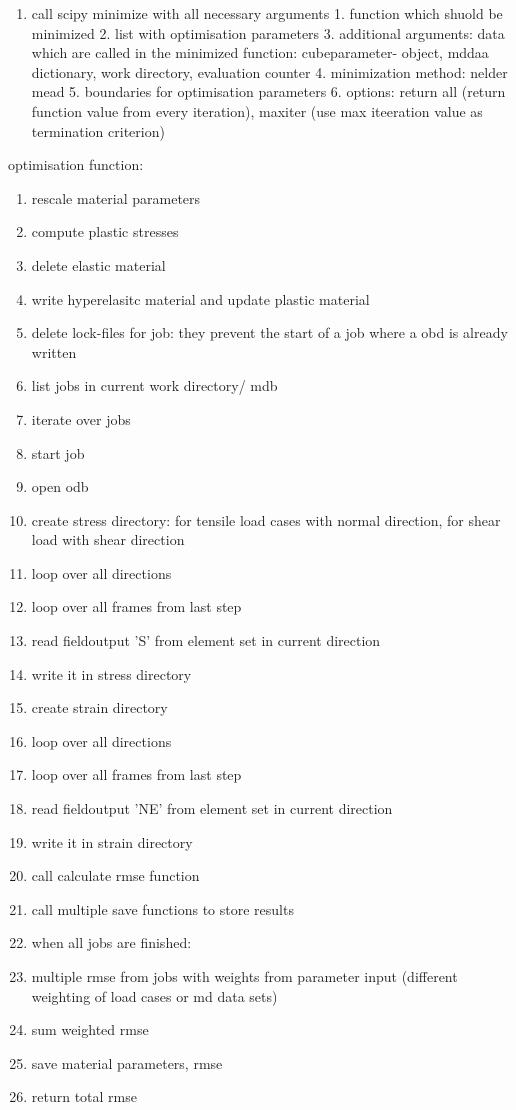     \begin{enumerate}
        \item call scipy minimize with all necessary arguments
            1. function which shuold be minimized
            2. list with optimisation parameters
            3. additional arguments: data which are called in the minimized function:
                cubeparameter- object, mddaa dictionary, work directory, evaluation counter
            4. minimization method: nelder mead
            5. boundaries for optimisation parameters
            6. options: return all (return function value from every iteration), maxiter (use max iteeration value as termination criterion)
    \end{enumerate}

    optimisation function:
    \begin{enumerate}
        \item rescale material parameters
        \item compute plastic stresses
        \item delete elastic material
        \item write hyperelasitc material and update plastic material
        \item delete lock-files for job: they prevent the start of a job where a obd is already written
        \item list jobs in current work directory/ mdb
        \item iterate over jobs
        \item start job
        \item open odb
        \item create stress directory: for tensile load cases with normal direction, for shear load with shear direction
        \item loop over all directions
        \item loop over all frames from last step
        \item read fieldoutput 'S' from element set in current direction 
        \item write it in stress directory
        \item create strain directory
        \item loop over all directions
        \item loop over all frames from last step
        \item read fieldoutput 'NE' from element set in current direction 
        \item write it in strain directory
        \item call calculate rmse function
        \item call multiple save functions to store results
        \item when all jobs are finished: 
        \item multiple rmse from jobs with weights from parameter input (different weighting of load cases or md data sets)
        \item sum weighted rmse 
        \item save material parameters, rmse
        \item return total rmse


\end{enumerate}

